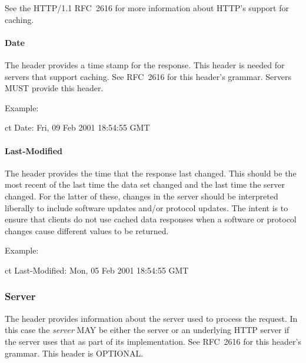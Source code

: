 \documentclass[justify]{nasa-ese}
\begin{document}
See the HTTP/1.1 RFC~2616\cite{rfc2616} for
more information about HTTP's support for caching.

\paragraph{Date}
The  header provides a time stamp for the response. This header
is needed for servers that support caching. See RFC~2616\cite{rfc2616}
for this header's grammar. Servers MUST provide this header.

Example:
\begin{vcode}{ct}
Date: Fri, 09 Feb 2001 18:54:55 GMT
\end{vcode}

\paragraph{Last-Modified}
The  header provides the time that the response
last changed. This should be the most recent of the last time the data
set changed and the last time the server changed. For the latter of
these, changes in the server should be interpreted liberally to
include software updates and/or protocol updates. The intent is to
ensure that clients do not use cached data responses when a software
or protocol changes cause different values to be returned.

Example:
\begin{vcode}{ct}
Last-Modified: Mon, 05 Feb 2001 18:54:55 GMT
\end{vcode}


\subsubsection{Server}
The  header provides information about the server used to
process the request. In this case the \emph{server} MAY be either the
\DAP server or an underlying \ac{HTTP} server if the \DAP server uses
that as part of its implementation. See RFC~2616\cite{rfc2616}
for this header's grammar. This header is OPTIONAL.
\end{document}
